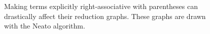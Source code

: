 \begin{figure}[htbp]
{	}

	\caption[$\omega_3 \omega_3 \omega_3 \omega_3$, $\omega_3 \omega_3 (\omega_3 \omega_3)$,
	$\omega_3 (\omega_3 (\omega_3 \omega_3))$]
	{Making terms explicitly right-associative with parentheses
	can drastically affect their reduction graphs. These graphs are
	drawn with the Neato algorithm.}
	\label{fig:images_Snake_2_NEATO}
\end{figure}

